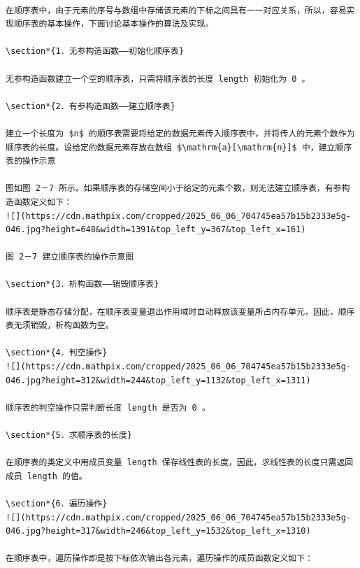 \documentclass[10pt]{article}
\begin{document}
\begin{verbatim}

在顺序表中，由于元素的序号与数组中存储该元素的下标之间具有一一对应关系，所以，容易实现顺序表的基本操作，下面讨论基本操作的算法及实现。

\section*{1．无参构造函数——初始化顺序表}

无参构造函数建立一个空的顺序表，只需将顺序表的长度 length 初始化为 0 。

\section*{2．有参构造函数——建立顺序表}

建立一个长度为 $n$ 的顺序表需要将给定的数据元素传入顺序表中，并将传人的元素个数作为顺序表的长度。设给定的数据元素存放在数组 $\mathrm{a}[\mathrm{n}]$ 中，建立顺序表的操作示意

图如图 2－7 所示。如果顺序表的存储空间小于给定的元素个数，则无法建立顺序表，有参构造函数定义如下：
![](https://cdn.mathpix.com/cropped/2025_06_06_704745ea57b15b2333e5g-046.jpg?height=648&width=1391&top_left_y=367&top_left_x=161)

图 2－7 建立顺序表的操作示意图

\section*{3．析构函数——销毁顺序表}

顺序表是静态存储分配，在顺序表变量退出作用域时自动释放该变量所占内存单元，因此，顺序表无须销毁，析构函数为空。

\section*{4．判空操作}
![](https://cdn.mathpix.com/cropped/2025_06_06_704745ea57b15b2333e5g-046.jpg?height=312&width=244&top_left_y=1132&top_left_x=1311)

顺序表的判空操作只需判断长度 length 是否为 0 。

\section*{5．求顺序表的长度}

在顺序表的类定义中用成员变量 length 保存线性表的长度，因此，求线性表的长度只需返回成员 length 的值。

\section*{6．遍历操作}
![](https://cdn.mathpix.com/cropped/2025_06_06_704745ea57b15b2333e5g-046.jpg?height=317&width=246&top_left_y=1532&top_left_x=1310)

在顺序表中，遍历操作即是按下标依次输出各元素，遍历操作的成员函数定义如下：
\end{verbatim}
\end{document}
